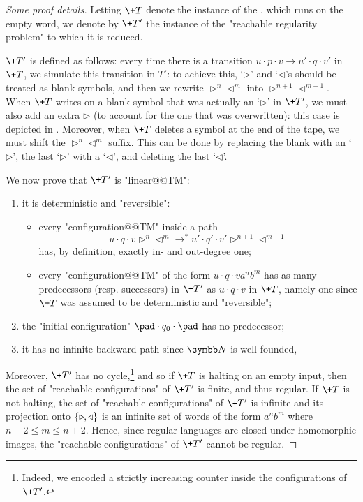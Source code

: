 \begin{proof}[Some proof details]
    Letting $\+T$ denote the instance of the , which runs on the empty word,
    we denote by $\+T'$ the instance of the "reachable regularity problem" to which it
    is reduced.

    $\+T'$ is defined as follows: every time there is a transition
    $u\cdot p \cdot v \to u' \cdot q \cdot v'$ in $\+T$,
	we simulate this transition in $T'$: to achieve this, `$\triangleright$' and `$\triangleleft$'s should be treated as blank symbols,
	and then we rewrite $\triangleright^n \triangleleft^m$ into $\triangleright^{n+1}\triangleleft^{m+1}$.
	When $\+T$ writes on a blank symbol that was actually an `$\triangleright$' in $\+T'$,
	we must also add an extra $\triangleright$ (to account for the one that was overwritten):
	this case is depicted in .
	Moreover, when $\+T$ deletes a symbol at the end of the tape,
	we must shift the $\triangleright^n \triangleleft^m$ suffix. This can be done by replacing the blank
	with an `$\triangleright$', the last `$\triangleright$' with a `$\triangleleft$', and deleting the last `$\triangleleft$'.
	
    We now prove that $\+T'$ is "linear@@TM":
    \begin{enumerate}
        \item it is deterministic and "reversible":
        \begin{itemize}
            \item every "configuration@@TM" inside a path
            \[u \cdot q\cdot v \triangleright^{n} \triangleleft^{m} \to^* u' \cdot q' \cdot v' \triangleright^{n+1} \triangleleft^{m+1}\]
            has, by definition, exactly in- and out-degree one;
            \item every "configuration@@TM" of the form $u \cdot q \cdot v a^n b^m$ has as many 
            predecessors (resp. successors) in $\+T'$ as $u \cdot q \cdot v$ in $\+T$, namely one since $\+T$ was assumed to be deterministic and "reversible";
        \end{itemize}
        \item the "initial configuration" $\pad \cdot q_0 \cdot \pad$ has no predecessor;
        \item it has no infinite backward path since $\N$ is well-founded,
    \end{enumerate}
    Moreover, $\+T'$ has no cycle,\footnote{Indeed, we encoded a strictly increasing counter inside the configurations of $\+T'$.} and so if $\+T$ is halting on an empty input, then the set of "reachable configurations" of $\+T'$ is finite, and thus regular. If $\+T$ is not halting, the set of "reachable configurations" of $\+T'$ is infinite and its projection onto $\{\triangleright,\triangleleft\}$ is an infinite set of words of the form $a^{n} b^{m}$ where $n-2 \leq m \leq n+2$. Hence, since regular languages are closed under homomorphic images, the "reachable configurations" of $\+T'$ cannot be regular.
\end{proof}


